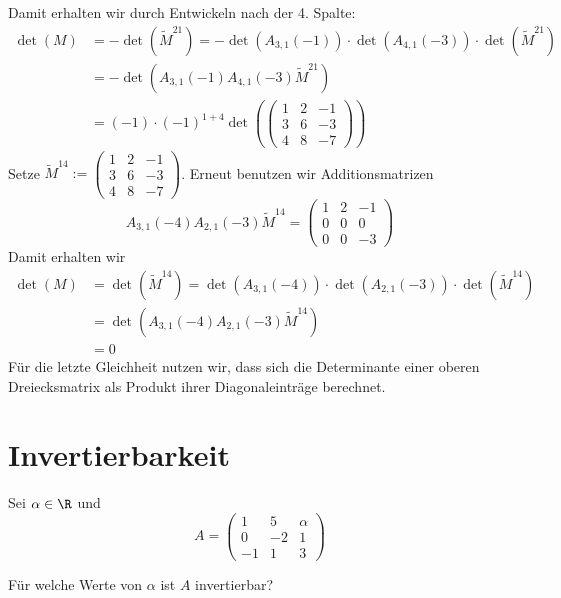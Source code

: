Damit erhalten wir durch Entwickeln nach der 4. Spalte:
\begin{align*}
\det(M)&=-\det(\tilde M^{21})=-\det(A_{3,1}(-1))\cdot\det(A_{4,1}(-3))\cdot\det(\tilde M^{21})\\
&=-\det(A_{3,1}(-1)A_{4,1}(-3)\tilde M^{21})\\
&=(-1)\cdot(-1)^{1+4}\det(\begin{pmatrix}
			 1	& 2	& -1	\\
			 3	& 6	& -3	\\
			 4	& 8	& -7	
	\end{pmatrix})
\end{align*}
Setze $\tilde M^{14}:=\begin{pmatrix}
			 1	& 2	& -1	\\
			 3	& 6	& -3	\\
			 4	& 8	& -7	
	\end{pmatrix}$.
Erneut benutzen wir Additionsmatrizen
$$
A_{3,1}(-4)A_{2,1}(-3)\tilde M^{14}=\begin{pmatrix}
			 1	& 2	& -1	\\
			 0	& 0	& 0	\\
			 0	& 0	& -3	
	\end{pmatrix}
$$
Damit erhalten wir 
\begin{align*}
\det(M)&=\det(\tilde M^{14})=\det(A_{3,1}(-4))\cdot\det(A_{2,1}(-3))\cdot\det(\tilde M^{14})\\
&=\det(A_{3,1}(-4)A_{2,1}(-3)\tilde M^{14})\\
&=0
\end{align*}
Für die letzte Gleichheit nutzen wir, dass sich die Determinante einer oberen Dreiecksmatrix als Produkt ihrer Diagonaleinträge berechnet.

\newpage
\section{Invertierbarkeit}

Sei $\alpha \in \R$ und
$$
	A =
	\begin{pmatrix}
		1	&5	&\alpha	\\
		0	&-2	&1	\\
		-1	&1	&3
	\end{pmatrix}
$$

F\"ur welche Werte von $\alpha$ ist $A$ invertierbar?
